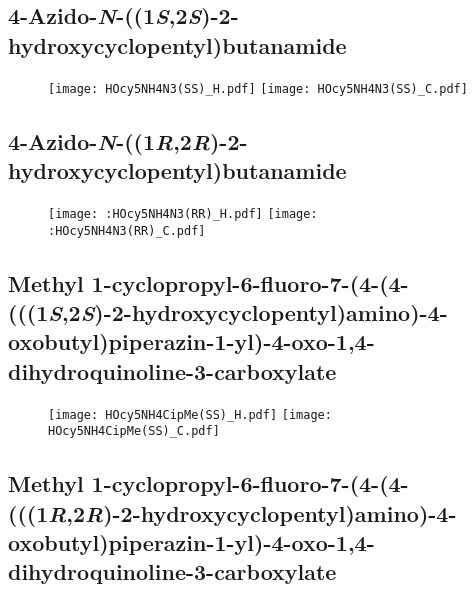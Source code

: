 \subsection{4\hyp{}Azido\hyp{}\textit{N}\hyp{}((1\textit{S},2\textit{S})\hyp{}2\hyp{}hydroxycyclopentyl)butanamide }

\begin{figure}[H]
	\centering
		\texttt{[image: HOcy5NH4N3(SS)\_H.pdf]}
		\texttt{[image: HOcy5NH4N3(SS)\_C.pdf]}
\end{figure}

\subsection{4\hyp{}Azido\hyp{}\textit{N}\hyp{}((1\textit{R},2\textit{R})\hyp{}2\hyp{}hydroxycyclopentyl)butanamide } 

\begin{figure}[H]
	\centering
		\texttt{[image: :HOcy5NH4N3(RR)\_H.pdf]}
		\texttt{[image: :HOcy5NH4N3(RR)\_C.pdf]}
\end{figure}

\subsection{Methyl 1\hyp{}cyclopropyl\hyp{}6\hyp{}fluoro\hyp{}7\hyp{}(4\hyp{}(4\hyp{}(((1\textit{S},2\textit{S})\hyp{}2\hyp{}hydroxycyclopentyl)amino)\hyp{}4\hyp{}oxobutyl)piperazin\hyp{}1\hyp{}yl)\hyp{}4\hyp{}oxo\hyp{}1,4\hyp{}dihydroquinoline\hyp{}3\hyp{}carboxylate }

\begin{figure}[H]
	\centering
		\texttt{[image: HOcy5NH4CipMe(SS)\_H.pdf]}
		\texttt{[image: HOcy5NH4CipMe(SS)\_C.pdf]}
\end{figure}

\subsection{Methyl 1\hyp{}cyclopropyl\hyp{}6\hyp{}fluoro\hyp{}7\hyp{}(4\hyp{}(4\hyp{}(((1\textit{R},2\textit{R})\hyp{}2\hyp{}hydroxycyclopentyl)amino)\hyp{}4\hyp{}oxobutyl)piperazin\hyp{}1\hyp{}yl)\hyp{}4\hyp{}oxo\hyp{}1,4\hyp{}dihydroquinoline\hyp{}3\hyp{}carboxylate }

